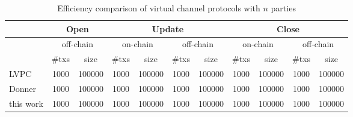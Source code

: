   \begin{table*}
    \caption{Efficiency comparison of virtual channel protocols with $n$
    parties}
    \label{table:comparison:overhead:n-parties}
    \begin{minipage}{\textwidth}
    \begin{center}
    \begin{tabular}{|l|c|c|c|c|c|c|c|c|c|c|}
    \hline
              & \multicolumn{2}{|c|}{Open} & \multicolumn{4}{|c|}{Update} &
              \multicolumn{4}{|c|}{Close} \\
    \hline
              & \multicolumn{2}{|c|}{off-chain} & \multicolumn{2}{|c|}{on-chain}
              & \multicolumn{2}{|c|}{off-chain} & \multicolumn{2}{|c|}{on-chain}
              & \multicolumn{2}{|c|}{off-chain} \\
    \hline
              & \#txs & size & \#txs & size & \#txs & size & \#txs & size &
              \#txs & size \\
    \hline
    LVPC      & 1000 & 100000 & 1000 & 100000 & 1000 & 100000 & 1000 & 100000 &
              1000 & 100000 \\
    \hline
    Donner    & 1000 & 100000 & 1000 & 100000 & 1000 & 100000 & 1000 & 100000 &
              1000 & 100000 \\
    \hline
    this work & 1000 & 100000 & 1000 & 100000 & 1000 & 100000 & 1000 & 100000 &
              1000 & 100000 \\
    \hline
    \end{tabular}
    \end{center}
    \end{minipage}
  \end{table*}
